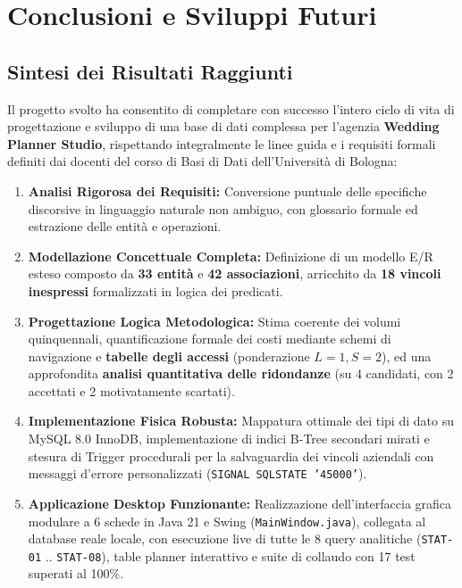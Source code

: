 \chapter{Conclusioni e Sviluppi Futuri}

\section{Sintesi dei Risultati Raggiunti}
Il progetto svolto ha consentito di completare con successo l'intero ciclo di vita di progettazione e sviluppo di una base di dati complessa per l'agenzia \textbf{Wedding Planner Studio}, rispettando integralmente le linee guida e i requisiti formali definiti dai docenti del corso di Basi di Dati dell'Università di Bologna:

\begin{enumerate}
    \item \textbf{Analisi Rigorosa dei Requisiti:} Conversione puntuale delle specifiche discorsive in linguaggio naturale non ambiguo, con glossario formale ed estrazione delle entità e operazioni.
    \item \textbf{Modellazione Concettuale Completa:} Definizione di un modello E/R esteso composto da \textbf{33 entità} e \textbf{42 associazioni}, arricchito da \textbf{18 vincoli inespressi} formalizzati in logica dei predicati.
    \item \textbf{Progettazione Logica Metodologica:} Stima coerente dei volumi quinquennali, quantificazione formale dei costi mediante schemi di navigazione e \textbf{tabelle degli accessi} (ponderazione $L=1, S=2$), ed una approfondita \textbf{analisi quantitativa delle ridondanze} (su 4 candidati, con 2 accettati e 2 motivatamente scartati).
    \item \textbf{Implementazione Fisica Robusta:} Mappatura ottimale dei tipi di dato su MySQL 8.0 InnoDB, implementazione di indici B-Tree secondari mirati e stesura di Trigger procedurali per la salvaguardia dei vincoli aziendali con messaggi d'errore personalizzati (\texttt{SIGNAL SQLSTATE '45000'}).
    \item \textbf{Applicazione Desktop Funzionante:} Realizzazione dell'interfaccia grafica modulare a 6 schede in Java 21 e Swing (\texttt{MainWindow.java}), collegata al database reale locale, con esecuzione live di tutte le 8 query analitiche (\texttt{STAT-01} .. \texttt{STAT-08}), table planner interattivo e suite di collaudo con 17 test superati al 100\%.
\end{enumerate}

